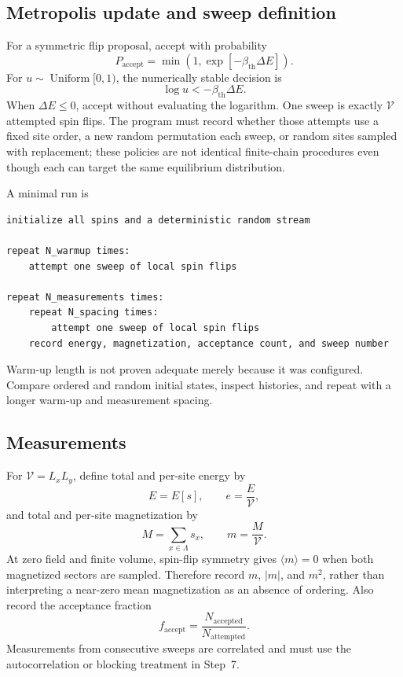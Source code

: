 \documentclass[11pt]{article}
\newcommand{\Vlat}{\mathcal{V}}
\begin{document}
\subsection{Metropolis update and sweep definition}

For a symmetric flip proposal, accept with probability
\begin{equation}
  P_{\mathrm{accept}}
  =\min\left(1,\exp[-\beta_{\mathrm{th}}\Delta E]\right).
  \label{eq:ising-acceptance}
\end{equation}
For \(u\sim\operatorname{Uniform}[0,1)\), the numerically stable decision is
\begin{equation}
  \log u<-\beta_{\mathrm{th}}\Delta E.
  \label{eq:ising-log-acceptance}
\end{equation}
When \(\Delta E\leq0\), accept without evaluating the logarithm.  One sweep is
exactly \(\Vlat\) attempted spin flips.  The program must record whether those
attempts use a fixed site order, a new random permutation each sweep, or random
sites sampled with replacement; these policies are not identical finite-chain
procedures even though each can target the same equilibrium distribution.

A minimal run is
\begin{verbatim}
initialize all spins and a deterministic random stream

repeat N_warmup times:
    attempt one sweep of local spin flips

repeat N_measurements times:
    repeat N_spacing times:
        attempt one sweep of local spin flips
    record energy, magnetization, acceptance count, and sweep number
\end{verbatim}
Warm-up length is not proven adequate merely because it was configured.
Compare ordered and random initial states, inspect histories, and repeat with a
longer warm-up and measurement spacing.

\subsection{Measurements}

For \(\Vlat=L_xL_y\), define total and per-site energy by
\begin{equation}
  E=E[s],
  \qquad
  e=\frac{E}{\Vlat},
  \label{eq:ising-energy-density}
\end{equation}
and total and per-site magnetization by
\begin{equation}
  M=\sum_{x\in\Lambda}s_x,
  \qquad
  m=\frac{M}{\Vlat}.
  \label{eq:ising-magnetization}
\end{equation}
At zero field and finite volume, spin-flip symmetry gives
\(\langle m\rangle=0\) when both magnetized sectors are sampled.  Therefore
record \(m\), \(|m|\), and \(m^2\), rather than interpreting a near-zero mean
magnetization as an absence of ordering.  Also record the acceptance fraction
\begin{equation}
  f_{\mathrm{accept}}
  =\frac{N_{\mathrm{accepted}}}{N_{\mathrm{attempted}}}.
  \label{eq:ising-acceptance-fraction}
\end{equation}
Measurements from consecutive sweeps are correlated and must use the
autocorrelation or blocking treatment in Step~7.
\end{document}
